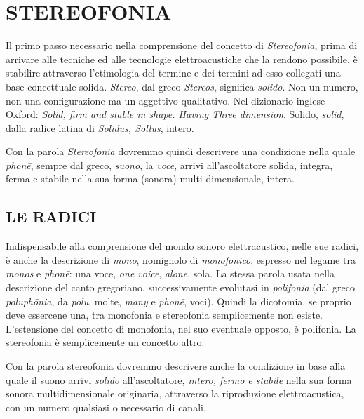 
\chapter{STEREOFONIA}
\startcontents[chapters]

\vfill\null

Il primo passo necessario nella comprensione del concetto di \emph{Stereofonia}, prima di
arrivare alle tecniche ed alle tecnologie elettroacustiche che la rendono
possibile, è stabilire attraverso l'etimologia del termine e dei
termini ad esso collegati una base concettuale solida. \emph{Stereo}, dal greco
\emph{Stereos}, significa \emph{solido}. Non un numero, non una configurazione
ma un aggettivo qualitativo. Nel dizionario inglese Oxford: \emph{Solid, firm
and stable in shape. Having Three dimension}. Solido, \emph{solid}, dalla radice
latina di \emph{Solidus, Sollus}, intero.

Con la parola \emph{Stereofonia} dovremmo quindi descrivere una condizione
nella quale \emph{phon\={e}}, sempre dal greco, \emph{suono}, la \emph{voce},
arrivi all'ascoltatore solida, integra, ferma e stabile nella sua forma (sonora)
multi dimensionale, intera.

\clearpage

\section{LE RADICI}

Indispensabile alla comprensione del mondo sonoro elettracustico, nelle sue
radici, è anche la descrizione di \emph{mono}, nomignolo di \emph{monofonico},
espresso nel legame tra \emph{monos} e \emph{phon\={e}}: una voce,
\emph{one voice}, \emph{alone}, sola. La stessa parola usata nella descrizione
del canto gregoriano, successivamente evolutasi in \emph{polifonia} (dal greco
\emph{poluph\={o}nia}, da \emph{polu}, molte, \emph{many} e \emph{phon\={e}},
voci). Quindi la dicotomia, se proprio deve essercene una, tra monofonia e
stereofonia semplicemente non esiste. L'estensione del concetto di monofonia,
nel suo eventuale opposto, è polifonia. La stereofonia è semplicemente un
concetto altro.

Con la parola stereofonia dovremmo descrivere anche la condizione in base alla
quale il suono arrivi \emph{solido} all'ascoltatore, \emph{intero, fermo e
stabile} nella sua forma sonora multidimensionale originaria, attraverso
la riproduzione elettroacustica, con un numero qualsiasi o necessario di canali.

